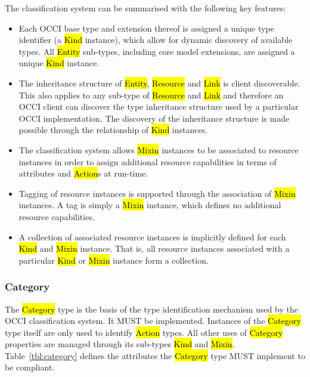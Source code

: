 \documentclass[10pt,a4paper]{article}
\begin{document}
The classification system can be summarised with the following key
features:

\begin{itemize}
  \item Each OCCI base type and extension thereof is assigned a unique
    type identifier (a \hl{Kind} instance), which allow for dynamic
    discovery of available types. All \hl{Entity} sub-types, including
    core model extensions, are assigned a unique \hl{Kind} instance.
  \item The inheritance structure of \hl{Entity}, \hl{Resource} and
    \hl{Link} is client discoverable. This also applies to any
    sub-type of \hl{Resource} and \hl{Link} and therefore an OCCI
    client can discover the type inheritance structure used by a
    particular OCCI implementation. The discovery of the inheritance
    structure is made possible through the relationship of \hl{Kind}
    instances.
  \item The classification system allows \hl{Mixin} instances to be
    associated to resource instances in order to assign additional
    resource capabilities in terms of attributes and \hl{Action}s at
    run-time.
  \item Tagging of resource instances is supported through the
    association of \hl{Mixin} instances. A tag is simply a \hl{Mixin}
    instance, which defines no additional resource capabilities.
  \item A collection of associated resource instances is implicitly
    defined for each \hl{Kind} and \hl{Mixin} instance. That is, all
    resource instances associated with a particular \hl{Kind} or
    \hl{Mixin} instance form a collection.
\end{itemize}

\subsubsection{Category}
\label{sec:category}
The \hl{Category} type is the basis of the type identification
mechanism used by the OCCI classification system. It MUST be
implemented. Instances of the \hl{Category} type itself are only used
to identify \hl{Action} types. All other uses of \hl{Category}
properties are managed through its sub-types \hl{Kind} and \hl{Mixin}.
%
Table~\ref{tbl:category} defines the attributes the \hl{Category} type
MUST implement to be compliant.
\end{document}
